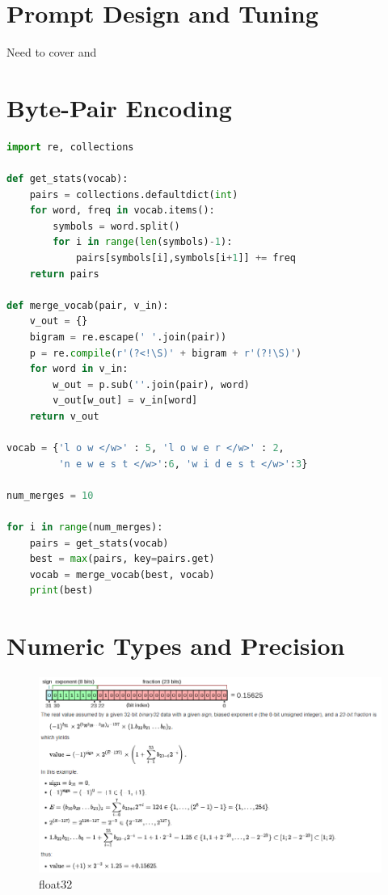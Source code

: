 \documentclass[11pt]{article}
\theoremstyle{definition}
\begin{document}
\section{Prompt Design and Tuning}

Need to cover \cite{li2021prefixtuning} and \cite{lester2021power}


\section{Byte-Pair Encoding} \label{BPE}

\begin{minipage}{\linewidth}
\begin{lstlisting}[language=Python, caption=Byte-Pair Encoding]
import re, collections

def get_stats(vocab):
    pairs = collections.defaultdict(int)
    for word, freq in vocab.items():
        symbols = word.split()
        for i in range(len(symbols)-1):
            pairs[symbols[i],symbols[i+1]] += freq
    return pairs

def merge_vocab(pair, v_in):
    v_out = {}
    bigram = re.escape(' '.join(pair))
    p = re.compile(r'(?<!\S)' + bigram + r'(?!\S)')
    for word in v_in:
        w_out = p.sub(''.join(pair), word)
        v_out[w_out] = v_in[word]
    return v_out

vocab = {'l o w </w>' : 5, 'l o w e r </w>' : 2,
         'n e w e s t </w>':6, 'w i d e s t </w>':3}

num_merges = 10

for i in range(num_merges):
    pairs = get_stats(vocab)
    best = max(pairs, key=pairs.get)
    vocab = merge_vocab(best, vocab)
    print(best)

\end{lstlisting}
\end{minipage}

\section{Numeric Types and Precision}

\begin{figure}
\centering
  \includegraphics[width=\textwidth,height=\textheight,keepaspectratio]{transformers/fp32-wikipedia.png}
  \caption{float32 \cite{float32img}}
  \label{fig:float32}
\end{figure}
\end{document}
